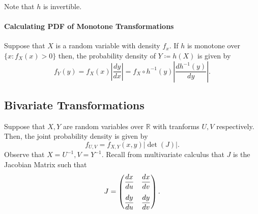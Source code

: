 Note that \( h \) is invertible.

\paragraph{Calculating PDF of Monotone Transformations}
Suppose that \( X \) is a random variable with density \( f_x \).
If \( h \) is monotone over \( \{x : f_X(x) > 0\}  \)
then, the probability density of \( Y \coloneqq h(X)\) 
is given by \[
    f_Y(y) = f_X(x) \left| \frac{dy}{dx} \right| 
    =
    f_X \circ h^{-1} (y) \left| \frac{dh^{-1}(y)}{dy}\right| 
.\]

\subsection{Bivariate Transformations}

Suppose that \( X, Y \) are random variables over \( \mathbb{R} \) with  tranforms
\( U, V \) respectively.
Then, the joint probability density is given by \[
    f_{U, V} = f_{X, Y}(x, y) |\det(J)|
.\]
Observe that \( X = U^{-1}, V = Y^{-1}\). Recall from multivariate
calculus that \( J \) is the Jacobian Matrix such that \[
    J = \begin{pmatrix} 
        \dfrac{dx}{du} & \dfrac{dx}{dv}
                \vspace{3mm}\\
        \dfrac{dy}{du} & \dfrac{dy}{dv}
    \end{pmatrix} 
.\]

